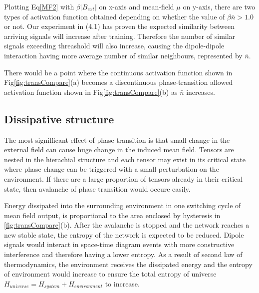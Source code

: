 \documentclass[11pt,a4paper]{article}
\begin{document}
\begin{multicols}{2}
  Plotting Eq\eqref{MF2} with $\beta |B_{ext}|$ on x-axis and mean-field $\mu$ on y-axis, there are two types of activation function obtained depending on whether the value of $\beta\bar{n} > 1.0$ or not. 
  Our experiment in (4.1) has proven the expected similarity between arriving signals will increase after training. 
  Therefore the number of similar signals exceeding threashold will also increase, causing the dipole-dipole interaction having more average number of similar neighbours, represented by $\bar{n}$. 

  There would be a point where the continuous activation function shown in Fig\ref{fig:transCompare}(a) becomes a discontinuous phase-transition allowed activation function shown in Fig\ref{fig:transCompare}(b) as $\bar{n}$ increases. 

  \subsection{Dissipative structure} 
  The most signifficant effect of phase transition is that small change in the external field can cause huge change in the induced mean field. 
  Tensors are nested in the hierachial structure and each tensor may exist in its critical state where phase change can be triggered with a small perturbation on the environment. 
  If there are a large proportion of tensors already in their critical state, then avalanche of phase transition would occure easily. 

  Energy dissipated into the surrounding environment in one switching cycle of mean field output, is proportional to the area enclosed by hysteresis in \ref{fig:transCompare}(b). 
  After the avalanche is stopped and the network reaches a new stable state, the entropy of the network is expected to be reduced. Dipole signals would interact in space-time diagram events with 
  more constructive interference and therefore having a lower entropy. As a result of second law of thermodynamics, the environment receives the dissipated energy and 
  the entropy of environment would increase to ensure the total entropy of universe $H_{universe}=H_{system}+H_{environment}$ to increase. 


\end{multicols}
\end{document}
